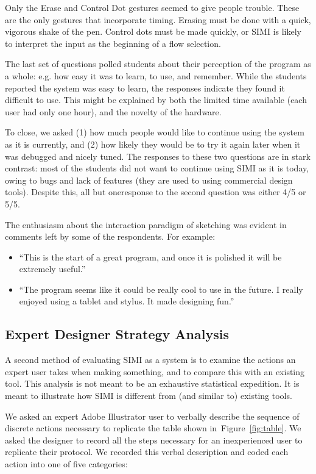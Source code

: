 \documentclass{article}
\begin{document}
Only the Erase and Control Dot gestures seemed to give people
trouble. These are the only gestures that incorporate timing. Erasing
must be done with a quick, vigorous shake of the pen. Control dots
must be made quickly, or SIMI is likely to interpret the input as the
beginning of a flow selection.

The last set of questions polled students about their perception of
the program as a whole: e.g. how easy it was to learn, to use, and
remember. While the students reported the system was easy to learn,
the responses indicate they found it difficult to use. This might be
explained by both the limited time available (each user had only one
hour), and the novelty of the hardware.

To close, we asked (1) how much people would like to continue using
the system as it is currently, and (2) how likely they would be to try
it again later when it was debugged and nicely tuned. The responses to
these two questions are in stark contrast: most of the students did
not want to continue using SIMI as it is today, owing to bugs and lack
of features (they are used to using commercial design tools). Despite
this, all but oneresponse to the second question was either 4/5 or
5/5.

The enthusiasm about the interaction paradigm of sketching was evident
in comments left by some of the respondents. For example:

\begin{itemize}
\item ``This is the start of a great program, and once it is polished it
  will be extremely useful.''
\item ``The program seems like it could be really cool to use in the
  future. I really enjoyed using a tablet and stylus. It made
  designing fun.''
\end{itemize}

\subsection{Expert Designer Strategy Analysis}

A second method of evaluating SIMI as a system is to examine the
actions an expert user takes when making something, and to compare
this with an existing tool. This analysis is not meant to be an
exhaustive statistical expedition. It is meant to illustrate how SIMI
is different from (and similar to) existing tools.

We asked an expert Adobe Illustrator user to verbally describe the
sequence of discrete actions necessary to replicate the table shown
in~Figure~\ref{fig:table}. We asked the designer to record all the
steps necessary for an inexperienced user to replicate their
protocol. We recorded this verbal description and coded each action
into one of five categories:
\end{document}
